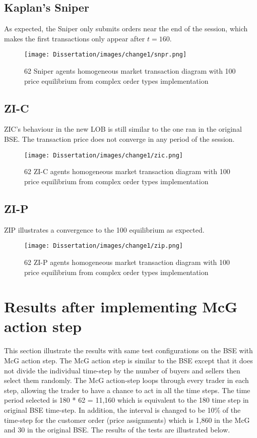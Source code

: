 \subsection{Kaplan's Sniper}
As expected, the Sniper only submits orders near the end of the session, which makes the first transactions only appear after $t = 160$.  
\begin{figure}[h]
\texttt{[image: Dissertation/images/change1/snpr.png]}
\caption{62 Sniper agents homogeneous market transaction diagram with 100 price equilibrium from complex order types implementation} 
\end{figure} 
\FloatBarrier

\subsection{ZI-C}
ZIC's behaviour in the new LOB is still similar to the one ran in the original BSE. The transaction price does not converge in any period of the session. 

\begin{figure}[h]
\texttt{[image: Dissertation/images/change1/zic.png]}
\caption{62 ZI-C agents homogeneous market transaction diagram with 100 price equilibrium from complex order types implementation} 
\end{figure} 
\FloatBarrier

\subsection{ZI-P}
ZIP illustrates a convergence to the 100 equilibrium as expected. 

\begin{figure}[h]
\texttt{[image: Dissertation/images/change1/zip.png]}
\caption{62 ZI-P agents homogeneous market transaction diagram with 100 price equilibrium from complex order types implementation} 
\end{figure} 
\FloatBarrier

\section{Results after implementing McG action step} 
This section illustrate the results with same test configurations on the BSE with McG action step. The McG action step is similar to the BSE except that it does not divide the individual time-step by the number of buyers and sellers then select them randomly. The McG action-step loops through every trader in each step, allowing the trader to have a chance to act in all the time steps. The time period selected is 180 * 62 = 11,160 which is equivalent to the 180 time step in original BSE time-step. In addition, the interval is changed to be 10\% of the time-step for the customer order (price assignments) which is 1,860 in the McG and 30 in the original BSE. The results of the tests are illustrated below. 

